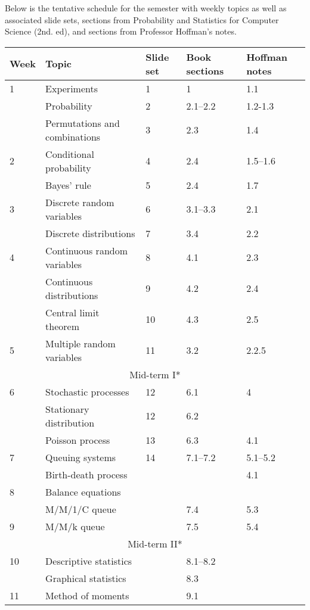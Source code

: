 \documentclass[10pt]{article}
\begin{document}
\pagestyle{fancy} 

Below is the tentative schedule for the semester with weekly topics as well as associated slide sets, sections from Probability and Statistics for Computer Science (2nd. ed), and sections from Professor Hoffman's notes.

\begin{center}
\begin{tabular}{|l|l|l|l|l|}
\hline
Week & Topic & Slide set & Book sections & Hoffman notes \\
\hline
1 & Experiments & 1 & 1 & 1.1 \\
& Probability & 2  & 2.1--2.2 & 1.2-1.3 \\
& Permutations and combinations & 3 & 2.3 & 1.4 \\
\hline
2 & Conditional probability & 4 & 2.4 & 1.5--1.6 \\
& Bayes' rule & 5 & 2.4 & 1.7 \\
\hline
3 & Discrete random variables & 6 & 3.1--3.3 & 2.1\\
& Discrete distributions & 7 & 3.4 & 2.2 \\
\hline
4 & Continuous random variables & 8 & 4.1 & 2.3 \\
& Continuous distributions & 9 & 4.2 & 2.4 \\
& Central limit theorem & 10 & 4.3 & 2.5 \\
\hline 
5 & Multiple random variables & 11 & 3.2 & 2.2.5 \\
\hline
\hline
\multicolumn{5}{|c|}{Mid-term I*} \\
\hline
\hline
6 & Stochastic processes & 12 & 6.1 & 4 \\
& Stationary distribution & 12 & 6.2 & \\
& Poisson process & 13 & 6.3 & 4.1 \\
\hline
7 & Queuing systems & 14 & 7.1--7.2 & 5.1--5.2 \\
 & Birth-death process &   & & 4.1 \\
\hline
8 & Balance equations &  & & \\
& M/M/1/C queue &  & 7.4 & 5.3 \\
\hline
9 & M/M/k queue &  & 7.5 & 5.4 \\
\hline
\hline
\multicolumn{5}{|c|}{Mid-term II*} \\
\hline
\hline
10 & Descriptive statistics &  & 8.1--8.2 & \\
& Graphical statistics &  & 8.3 & \\
\hline 
11 & Method of moments &  & 9.1 & \\

\end{tabular}
\end{center}
\end{document}

